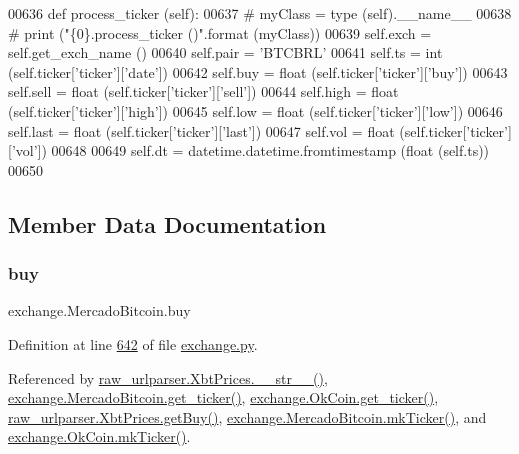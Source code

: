 \begin{DoxyCode}
00636     \textcolor{keyword}{def }process\_ticker (self):
00637 \textcolor{comment}{#        myClass = type (self).\_\_name\_\_}
00638 \textcolor{comment}{#        print ("\{0\}.process\_ticker ()".format (myClass))}
00639         self.exch = self.get\_exch\_name ()
00640         self.pair = \textcolor{stringliteral}{'BTCBRL'}
00641         self.ts   = int   (self.ticker[\textcolor{stringliteral}{'ticker'}][\textcolor{stringliteral}{'date'}])
00642         self.buy  = float (self.ticker[\textcolor{stringliteral}{'ticker'}][\textcolor{stringliteral}{'buy'}])
00643         self.sell = float (self.ticker[\textcolor{stringliteral}{'ticker'}][\textcolor{stringliteral}{'sell'}])
00644         self.high = float (self.ticker[\textcolor{stringliteral}{'ticker'}][\textcolor{stringliteral}{'high'}])
00645         self.low  = float (self.ticker[\textcolor{stringliteral}{'ticker'}][\textcolor{stringliteral}{'low'}])
00646         self.last = float (self.ticker[\textcolor{stringliteral}{'ticker'}][\textcolor{stringliteral}{'last'}])
00647         self.vol  = float (self.ticker[\textcolor{stringliteral}{'ticker'}][\textcolor{stringliteral}{'vol'}])
00648     
00649         self.dt = datetime.datetime.fromtimestamp (float (self.ts))
00650     
\end{DoxyCode}


\subsection{Member Data Documentation}
\mbox{\label{classexchange_1_1_mercado_bitcoin_ada27b62a35286b9f5dbb54590c5bacd2}} 
\subsubsection{\texorpdfstring{buy}{buy}}
{\footnotesize\ttfamily exchange.\+Mercado\+Bitcoin.\+buy}



Definition at line \hyperlink{exchange_8py_source_l00642}{642} of file \hyperlink{exchange_8py_source}{exchange.\+py}.



Referenced by \hyperlink{raw__urlparser_8py_source_l00074}{raw\+\_\+urlparser.\+Xbt\+Prices.\+\_\+\+\_\+str\+\_\+\+\_\+()}, \hyperlink{exchange_8py_source_l00651}{exchange.\+Mercado\+Bitcoin.\+get\+\_\+ticker()}, \hyperlink{exchange_8py_source_l00716}{exchange.\+Ok\+Coin.\+get\+\_\+ticker()}, \hyperlink{raw__urlparser_8py_source_l00062}{raw\+\_\+urlparser.\+Xbt\+Prices.\+get\+Buy()}, \hyperlink{exchange_8py_source_l00665}{exchange.\+Mercado\+Bitcoin.\+mk\+Ticker()}, and \hyperlink{exchange_8py_source_l00730}{exchange.\+Ok\+Coin.\+mk\+Ticker()}.

